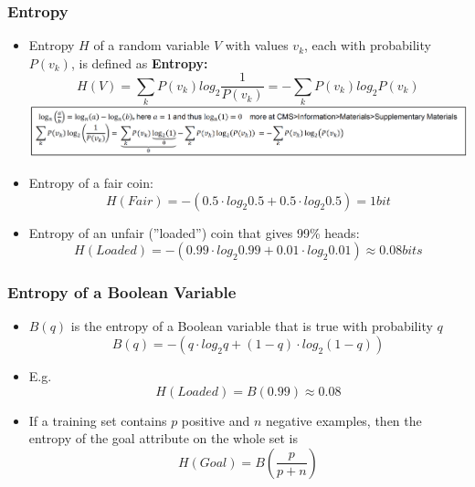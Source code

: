\documentclass[conference]{styles/acmsiggraph}
\begin{document}
        \subsubsection{Entropy}
            \begin{itemize}
                \item Entropy $H$ of a random variable $V$ with values $v_k$, each with probability $P(v_k)$, is defined as\newline
                \textbf{Entropy:} 
                $$H(V) = \sum\limits_{k} P(v_k) log_2 \frac{1}{P(v_k)} = - \sum\limits_{k} P(v_k) log_2 P(v_k)$$
                \includegraphics[width=1\textwidth]{imgs/Entropy.png}
                \item Entropy of a fair coin:
                $$H(Fair) = -(0.5 \cdot log_2 0.5 + 0.5 \cdot log_2 0.5) = 1 bit$$
                \item Entropy of an unfair (''loaded'') coin that gives 99\% heads:
                $$H(Loaded) = -(0.99 \cdot log_2 0.99 + 0.01 \cdot log_2 0.01) \approx 0.08 bits$$
            \end{itemize}
        
        \subsubsection{Entropy of a Boolean Variable}
            \begin{itemize}
                \item $B(q)$ is the entropy of a Boolean variable that is true with probability $q$
                $$B(q) = -(q \cdot log_2 q + (1-q) \cdot log_2 (1-q))$$
                \item E.g.
                $$H(Loaded) = B(0.99) \approx 0.08$$
\newpage
                \item If a training set contains $p$ positive and $n$ negative examples, then the entropy of the goal attribute on the whole set is
                $$H(Goal) = B \left(\frac{p}{p+n}\right)$$
            \end{itemize}
        
\end{document}
